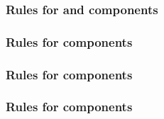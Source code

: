 \begin{sbmlenum}

\end{sbmlenum} \subsubsection*{Rules for  and  components} \begin{sbmlenum}


\end{sbmlenum} \subsubsection*{Rules for  components} \begin{sbmlenum}


\end{sbmlenum} \subsubsection*{Rules for  components} \begin{sbmlenum}


\end{sbmlenum} \subsubsection*{Rules for  components} \begin{sbmlenum}


\end{sbmlenum}
